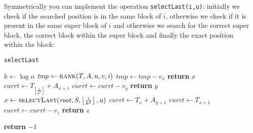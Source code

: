 \documentclass{article}
\begin{document}
Symmetrically you can implement the operation \texttt{selectLast(i,u)}: initially we check if the searched position is in the same block of $i$, otherwise we check if it is present in the same super block of $i$ and otherwise we search for the correct super block, the correct block within the super block and finally the exact position within the block:
    \begin{algorithm}[H]
    \caption{\texttt{selectLast}}\label{selectLast} %
    \begin{algorithmic}[1]
        \State $k\gets\log{n}$
        \State $\mathit{tmp}\gets\Call{rank}{T,A,n,v,i}$
        \State
            \State $\mathit{tmp}\gets \mathit{tmp}-v_x$
                \State \textbf{return} $x$
            \EndIf
        \EndFor
        \State
                \State $\mathit{currt}\gets T_{\left\lfloor{\frac{i}{k^2}}\right\rfloor}+A_{x+1}$
                    \State $\mathit{currt}\gets \mathit{currt}-v_y$
                        \State \textbf{return} $y$
                    \EndIf
                \EndFor
            \EndIf
        \EndFor
        \State
        \State $x\gets \Call{selectLast}{\mathit{root},S,\left\lfloor{\frac{i}{k^2}}\right\rfloor,u}$ 
                        \State $\mathit{currt}\gets T_x+A_{y+1}$
                    \Else
                        \State $\mathit{currt}\gets T_{x+1}$
                    \EndIf
                        \State $\mathit{currt}\gets \mathit{currt}-v_z$
                            \State \textbf{return} $z$
                        \EndIf
    \end{algorithmic}
    \end{algorithm}
    \begin{algorithm}[ht]
    \begin{algorithmic}[1]
                    \EndFor
                \EndIf
            \EndFor
        \EndIf
        \State \textbf{return} $-1$ 
    \EndProcedure
    \end{algorithmic}
    \end{algorithm}
\end{document}

